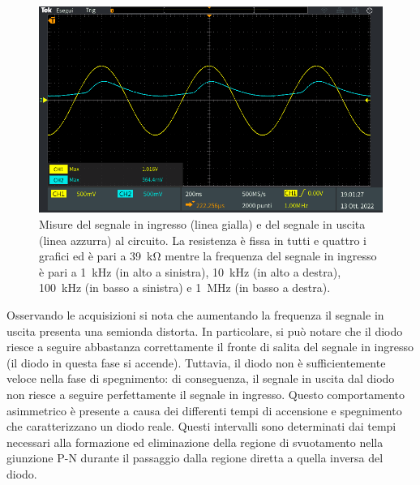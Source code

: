 \begin{figure}[tbh]
\begin{minipage}{.496\textwidth}
	\end{minipage}
	\begin{minipage}{.496\textwidth}
		\includegraphics[width=\linewidth]{./ImageFiles/Laboratorio 2/TEK00014.PNG}
	\end{minipage}
	\caption{Misure del segnale in ingresso (linea gialla) e del segnale in uscita (linea azzurra) al circuito. La resistenza è fissa in tutti e quattro i grafici ed è pari a \SI{39}{\kilo\ohm} mentre la frequenza del segnale in ingresso è pari a \SI{1}{\kilo\hertz} (in alto a sinistra), \SI{10}{\kilo\hertz} (in alto a destra), \SI{100}{\kilo\hertz} (in basso a sinistra) e \SI{1}{\mega\hertz} (in basso a destra).}
	\label{fig:freqwith38}
\end{figure}
Osservando le acquisizioni si nota che aumentando la frequenza il segnale in uscita presenta una semionda distorta. In particolare, si può notare che il diodo riesce a seguire abbastanza correttamente il fronte di salita del segnale in ingresso (il diodo in questa fase si accende). Tuttavia, il diodo non è sufficientemente veloce nella fase di spegnimento: di conseguenza, il segnale in uscita dal diodo non riesce a seguire perfettamente il segnale in ingresso. Questo comportamento asimmetrico è presente a causa dei differenti tempi di accensione e spegnimento che caratterizzano un diodo reale. Questi intervalli sono determinati dai tempi necessari alla formazione ed eliminazione della regione di svuotamento nella giunzione P-N durante il passaggio dalla regione diretta a quella inversa del diodo.  

\clearpage

